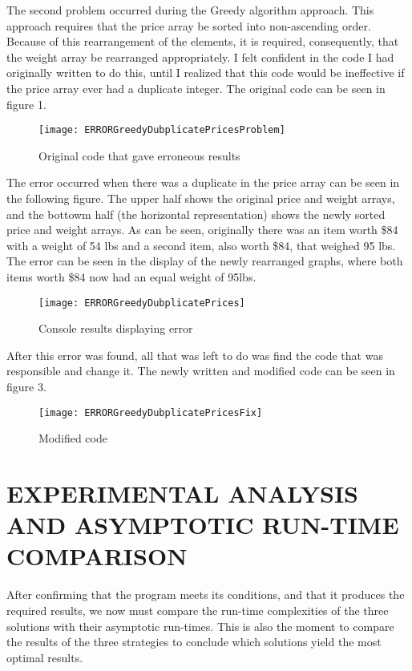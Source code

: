 \documentclass[12pt]{article}
\begin{document}
The second problem occurred during the Greedy algorithm approach. This approach requires that the price array be sorted into non-ascending order. Because of this rearrangement of the elements, it is required, consequently, that the weight array be rearranged appropriately. I felt confident in the code I had originally written to do this, until I realized that this code would be ineffective if the price array ever had a duplicate integer. The original code can be seen in figure 1.  \\

\begin{figure}[H]
		\begin{center}    
    		\texttt{[image: ERRORGreedyDubplicatePricesProblem]}
            \caption{Original code that gave erroneous results}
    	\end{center}
    \end{figure}
    
The error occurred when there was a duplicate in the price array can be seen in the following figure. The upper half shows the original price and weight arrays, and the bottowm half (the horizontal representation) shows the newly sorted price and weight arrays. As can be seen, originally there was an item worth \$84 with a weight of 54 lbs and a second item, also worth \$84, that weighed 95 lbs. The error can be seen in the display of the newly rearranged graphs, where both items worth \$84 now had an equal weight of 95lbs. 
\begin{figure}[H]
		\begin{center}    
    		\texttt{[image: ERRORGreedyDubplicatePrices]}
            \caption{Console results displaying error}
    	\end{center}
    \end{figure}
    
    After this error was found, all that was left to do was find the code that was responsible and change it. The newly written and modified code can be seen in figure 3. 

    
    \begin{figure}[H]
		\begin{center}    
    		\texttt{[image: ERRORGreedyDubplicatePricesFix]}
            \caption{Modified code}
    	\end{center}
    \end{figure}
	\pagebreak
	
	\section*{EXPERIMENTAL ANALYSIS AND ASYMPTOTIC RUN-TIME COMPARISON}
	After confirming that the program meets its conditions, and that it produces the required results, we now must compare the run-time complexities of the three solutions with their asymptotic run-times. This is also the moment to compare the results of the three strategies to conclude which solutions yield the most optimal results.\\ 
	
\end{document}
